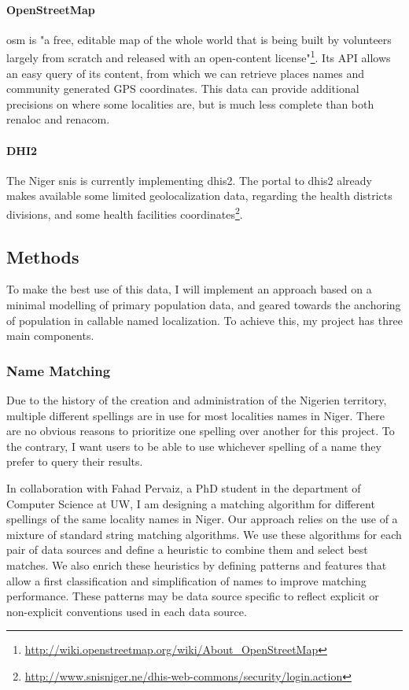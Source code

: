 \paragraph{OpenStreetMap} \gls{osm} is "a free, editable map of the whole world that is being built by volunteers largely from scratch and released with an open-content license"\footnote{\url{http://wiki.openstreetmap.org/wiki/About_OpenStreetMap}}. Its API allows an easy query of its content, from which we can retrieve places names and community generated GPS coordinates. This data can provide additional precisions on where some localities are, but is much less complete than both \gls{renaloc} and \gls{renacom}.

\paragraph{DHI2} The Niger \gls{snis} is currently implementing \gls{dhis2}. The portal to \gls{dhis2} already makes available some limited geolocalization data, regarding the health districts divisions, and some health facilities coordinates\footnote{\url{http://www.snisniger.ne/dhis-web-commons/security/login.action}}.


\subsection{Methods}

To make the best use of this data, I will implement an approach based on a minimal modelling of primary population data, and geared towards the anchoring of population in callable named localization. To achieve this, my project has three main components.

\subsubsection{Name Matching}

Due to the history of the creation and administration of the Nigerien territory, multiple different spellings are in use for most localities names in Niger. There are no obvious reasons to prioritize one spelling over another for this project. To the contrary, I want users to be able to use whichever spelling of a name they prefer to query their results.

In collaboration with Fahad Pervaiz, a PhD student in the department of Computer Science at UW, I am designing a matching algorithm for different spellings of the same locality names in Niger. Our approach relies on the use of  a mixture of standard string matching algorithms. We use these algorithms for each pair of data sources and define a heuristic to combine them and select best matches. We also enrich these heuristics by defining patterns and features that allow a first classification and simplification of names to improve matching performance. These patterns may be data source specific to reflect explicit or non-explicit conventions used in each data source.

